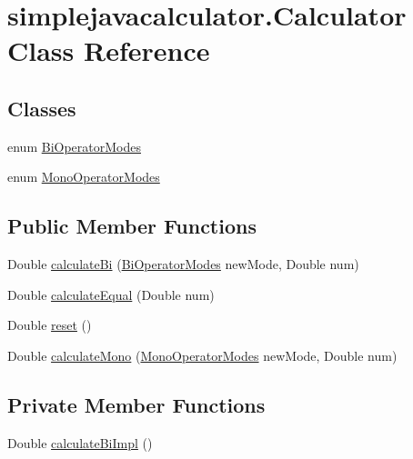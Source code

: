 \hypertarget{classsimplejavacalculator_1_1_calculator}{}\section{simplejavacalculator.\+Calculator Class Reference}
\label{classsimplejavacalculator_1_1_calculator}
\subsection*{Classes}
\begin{DoxyCompactItemize}
\item 
enum \mbox{\hyperlink{enumsimplejavacalculator_1_1_calculator_1_1_bi_operator_modes}{Bi\+Operator\+Modes}}
\item 
enum \mbox{\hyperlink{enumsimplejavacalculator_1_1_calculator_1_1_mono_operator_modes}{Mono\+Operator\+Modes}}
\end{DoxyCompactItemize}
\subsection*{Public Member Functions}
\begin{DoxyCompactItemize}
\item 
Double \mbox{\hyperlink{classsimplejavacalculator_1_1_calculator_a3fc8bb3efd14ca75851e4b37ce95ed54}{calculate\+Bi}} (\mbox{\hyperlink{enumsimplejavacalculator_1_1_calculator_1_1_bi_operator_modes}{Bi\+Operator\+Modes}} new\+Mode, Double num)
\item 
Double \mbox{\hyperlink{classsimplejavacalculator_1_1_calculator_a63b92efb67ed9b46fdab9348f2521483}{calculate\+Equal}} (Double num)
\item 
Double \mbox{\hyperlink{classsimplejavacalculator_1_1_calculator_a0dded345ec8ca551ee858fc775db0cb9}{reset}} ()
\item 
Double \mbox{\hyperlink{classsimplejavacalculator_1_1_calculator_aee1f1a384b0f0f066591ac48e29f8179}{calculate\+Mono}} (\mbox{\hyperlink{enumsimplejavacalculator_1_1_calculator_1_1_mono_operator_modes}{Mono\+Operator\+Modes}} new\+Mode, Double num)
\end{DoxyCompactItemize}
\subsection*{Private Member Functions}
\begin{DoxyCompactItemize}
\item 
Double \mbox{\hyperlink{classsimplejavacalculator_1_1_calculator_a3a95a22b6cfe0b22a1c723452d70894f}{calculate\+Bi\+Impl}} ()
\end{DoxyCompactItemize}
